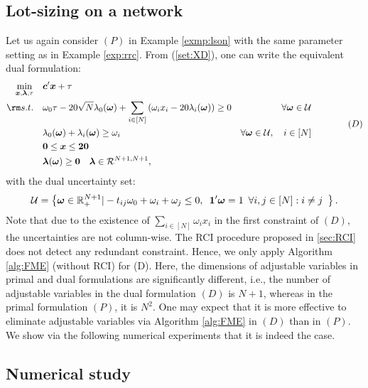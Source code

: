 \documentclass[fleqn,isre,blindrev]{informs4}
\newcommand{\mb}[1]{\mbox{\boldmath \ensuremath{#1}}}
\begin{document}
		\subsection{Lot-sizing on a network} \label{sec:lsonproblem}
		
		Let us again consider $(P)$ in Example \ref{exmp:lson} with the same parameter setting as in Example \ref{exp:rrc}. From (\ref{set:XD}), one can write the equivalent dual formulation:
\begin{equation*}%
			\begin{aligned} 
				\min_{ \boldsymbol{x} ,\boldsymbol{\lambda}, \tau} \quad &  \mb{c}'\mb{x} + \tau \\
				{\rm s.t.}  \quad & \omega_0\tau - 20\sqrt{N}\lambda_0(\mb{\omega}) + \sum_{i\in [N]}  \left(  \omega_i x_i - 20\lambda_i(\mb{\omega})  \right)  \ge 0   & \forall \mb{\omega} \in \mathcal{U} \\
				\quad & \lambda_0(\mb{\omega}) + \lambda_i (\mb{\omega})\ge \omega_i & \forall \mb{\omega} \in \mathcal{U}, \quad i \in [N]\\
				\quad &   \mb{0}\le \mb{x} \le \mb{20}\\
				\quad & \boldsymbol{\lambda}(\mb{\omega}) \ge \mb{0}	\quad  \mb{\lambda} \in \mathcal{R}^{N+1,N+1},
			\end{aligned} \qquad \qquad (D)
\end{equation*}
		with the dual uncertainty set:
\begin{equation*}
		\mathcal{U}=\left\{ \mb{\omega} \in \mathbb{R}^{N+1}_+| -t_{ij}\omega_0 + \omega_i + \omega_j \le 0, \,\,\, \boldsymbol{1}'\boldsymbol{\omega} = 1 \,\,\, \forall i,j \in [N]: i\ne j \,\,\, \right\}.
\end{equation*}
		Note that due to the existence of  $\sum_{i\in [N]} \omega_i x_i$ in the first constraint of $(D)$, the uncertainties are not column-wise. The RCI procedure proposed in \textsection \ref{sec:RCI} does not detect any redundant constraint. Hence, we only apply Algorithm \ref{alg:FME} (without RCI) for (D). Here, the dimensions of adjustable variables in primal and dual formulations are significantly different, i.e., the number of adjustable variables in the dual formulation $(D)$ is $N+1$, whereas in the primal formulation $(P)$, it is $N^2$. One may expect that it is more effective to eliminate adjustable variables via Algorithm \ref{alg:FME} in $(D)$ than in  $(P)$. We show via the following numerical experiments that it is indeed the case.
		
		\subsection*{Numerical study}
	
\end{document}
